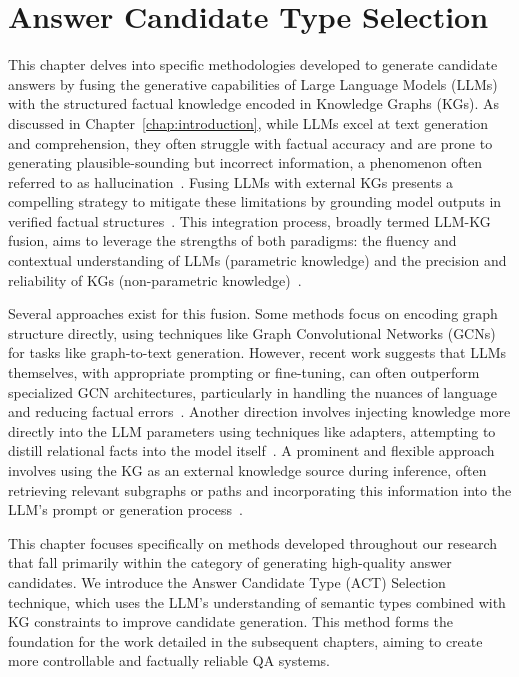 \chapter{Answer Candidate Type Selection}
\label{chap:candidate_generation}


This chapter delves into specific methodologies developed to generate candidate answers by fusing the generative capabilities of Large Language Models (LLMs) with the structured factual knowledge encoded in Knowledge Graphs (KGs). As discussed in Chapter~\ref{chap:introduction}, while LLMs excel at text generation and comprehension, they often struggle with factual accuracy and are prone to generating plausible-sounding but incorrect information, a phenomenon often referred to as hallucination~\cite{lin-etal-2022-truthfulqa, DBLP:conf/emnlp/RobertsRS20}. Fusing LLMs with external KGs presents a compelling strategy to mitigate these limitations by grounding model outputs in verified factual structures~\cite{DBLP:journals/tkde/PanLWCWW24}. This integration process, broadly termed LLM-KG fusion, aims to leverage the strengths of both paradigms: the fluency and contextual understanding of LLMs (parametric knowledge) and the precision and reliability of KGs (non-parametric knowledge)~\cite{DBLP:conf/acl/MallenAZDKH23}.

Several approaches exist for this fusion. Some methods focus on encoding graph structure directly, using techniques like Graph Convolutional Networks (GCNs) for tasks like graph-to-text generation. However, recent work suggests that LLMs themselves, with appropriate prompting or fine-tuning, can often outperform specialized GCN architectures, particularly in handling the nuances of language and reducing factual errors~\cite{iarosh-etal-2025-reducing, DBLP:conf/ijcai/0001LW0S0Y24}. Another direction involves injecting knowledge more directly into the LLM parameters using techniques like adapters, attempting to distill relational facts into the model itself~\cite{DBLP:journals/corr/abs-2002-01808}. A prominent and flexible approach involves using the KG as an external knowledge source during inference, often retrieving relevant subgraphs or paths and incorporating this information into the LLM's prompt or generation process~\cite{DBLP:conf/emnlp/KnowledgeAugmented}.

This chapter focuses specifically on methods developed throughout our research that fall primarily within the category of generating high-quality answer candidates. We introduce the Answer Candidate Type (ACT) Selection~\cite{DBLP:journals/corr/abs-2310-07008} technique, which uses the LLM's understanding of semantic types combined with KG constraints to improve candidate generation. This method forms the foundation for the work detailed in the subsequent chapters, aiming to create more controllable and factually reliable QA systems.


